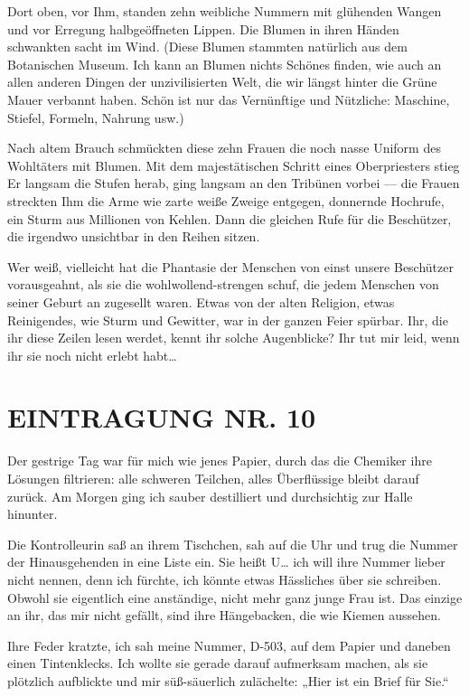 Dort
oben, vor Ihm, standen zehn weibliche Nummern mit glühenden Wangen
und vor Erregung halbgeöffneten Lippen. Die Blumen in ihren Händen
schwankten sacht im Wind. (Diese Blumen stammten natürlich aus dem
Botanischen Museum. Ich kann an Blumen nichts Schönes finden, wie
auch an allen anderen Dingen der unzivilisierten Welt, die wir
längst hinter die Grüne Mauer verbannt haben. Schön ist nur das
Vernünftige und Nützliche: Maschine, Stiefel, Formeln, Nahrung
usw.)

Nach altem Brauch schmückten diese zehn Frauen die noch nasse
Uniform des Wohltäters mit Blumen. Mit dem majestätischen Schritt
eines Oberpriesters stieg Er langsam die Stufen herab, ging langsam
an den Tribünen vorbei — die Frauen streckten Ihm die Arme wie
zarte weiße Zweige entgegen, donnernde Hochrufe, ein Sturm aus
Millionen von Kehlen. Dann die gleichen Rufe für die Beschützer,
die irgendwo unsichtbar in den Reihen sitzen.

Wer weiß, vielleicht hat die Phantasie der Menschen von einst
unsere Beschützer vorausgeahnt, als sie die wohlwollend-strengen
 schuf, die jedem Menschen von seiner Geburt an
zugesellt waren.
%
Etwas von der alten Religion, etwas Reinigendes,
wie Sturm und Gewitter, war in der ganzen Feier spürbar. Ihr, die
ihr diese Zeilen lesen werdet, kennt ihr solche Augenblicke? Ihr
tut mir leid, wenn ihr sie noch nicht erlebt habt\ldots{}

\section{EINTRAGUNG NR. 10}

Der gestrige Tag war für mich wie jenes Papier, durch das die
Chemiker ihre Lösungen filtrieren: alle schweren Teilchen, alles
Überflüssige bleibt darauf zurück. Am Morgen ging ich sauber
destilliert und durchsichtig zur Halle hinunter.

Die Kontrolleurin saß an ihrem Tischchen, sah auf die Uhr und trug
die Nummer der Hinausgehenden in eine Liste ein. Sie heißt U\ldots{} ich
will ihre Nummer lieber nicht nennen, denn ich fürchte, ich könnte
etwas Hässliches über sie schreiben. Obwohl sie eigentlich eine
anständige, nicht mehr ganz junge Frau ist. Das einzige an ihr, das
mir nicht gefällt, sind ihre Hängebacken, die wie Kiemen aussehen.

Ihre Feder kratzte, ich sah meine Nummer, D-503, auf dem Papier und
daneben einen Tintenklecks. Ich wollte sie gerade darauf aufmerksam
machen, als sie plötzlich aufblickte und mir süß-säuerlich
zulächelte:
%
„Hier ist ein Brief für Sie.“

